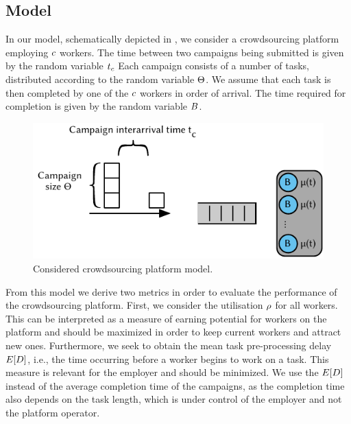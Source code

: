 \subsection{Model}\label{sec:cloud:crowdsourcing:model}

In our model, schematically depicted in , we consider a crowdsourcing  platform employing \(c\) workers.
The time between two campaigns being submitted is given by the random variable \(t_c\)
Each campaign consists of a number of tasks, distributed according to the random variable \(\Theta\).
We assume that each task is then completed by one of the \(c\) workers in order of arrival.
The time required for completion is given by the random variable \(B\).

\begin{figure}
  \centering
  \includegraphics{cloud/crowdsourcing/model/figures/model}
  \caption{Considered crowdsourcing platform model.}
  \label{fig:sec:cloud:crowdsourcing:model:model}
\end{figure}

From this model we derive two metrics in order to evaluate the performance of the crowdsourcing platform.
First, we consider the utilisation \(\rho\) for all workers.
This can be interpreted as a measure of earning potential for workers on the platform and should be maximized in order to keep current workers and attract new ones. 
Furthermore, we seek to obtain the mean task pre-processing delay \(E[D]\), i.e., the time occurring before a worker begins to work on a task.
This measure is relevant for the employer and should be minimized.
We use the \(E[D]\) instead of the average completion time of the campaigns, as the completion time also depends on the task length, which is under control of the employer and not the platform operator.

